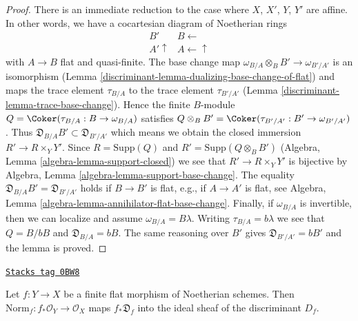 \begin{proof}

There is an immediate reduction to the case where $X$, $X'$, $Y$, $Y'$
are affine. In other words, we have a cocartesian diagram of Noetherian
rings
$$
\begin{array}{cc}B' & B \longleftarrow \\ A' \uparrow & A \longleftarrow\uparrow\end{array}
$$
with $A \to B$ flat and quasi-finite. The base change map
$\omega_{B/A} \otimes_B B' \to \omega_{B'/A'}$ is an isomorphism
(Lemma \ref{discriminant-lemma-dualizing-base-change-of-flat}) and maps
the trace element $\tau_{B/A}$ to the trace element $\tau_{B'/A'}$
(Lemma \ref{discriminant-lemma-trace-base-change}).
Hence the finite $B$-module $Q = \Coker(\tau_{B/A} : B \to \omega_{B/A})$
satisfies $Q \otimes_B B' = \Coker(\tau_{B'/A'} : B' \to \omega_{B'/A'})$.
Thus $\mathfrak{D}_{B/A}B' \subset \mathfrak{D}_{B'/A'}$ which means
we obtain the closed immersion $R' \to R \times_Y Y'$.
Since $R = \text{Supp}(Q)$ and $R' = \text{Supp}(Q \otimes_B B')$
(Algebra, Lemma \ref{algebra-lemma-support-closed})
we see that $R' \to R \times_Y Y'$ is bijective by
Algebra, Lemma \ref{algebra-lemma-support-base-change}.
The equality $\mathfrak{D}_{B/A}B' = \mathfrak{D}_{B'/A'}$ holds
if $B \to B'$ is flat, e.g., if $A \to A'$ is flat, see
Algebra, Lemma \ref{algebra-lemma-annihilator-flat-base-change}.
Finally, if $\omega_{B/A}$ is invertible, then we can localize
and assume $\omega_{B/A} = B \lambda$. Writing $\tau_{B/A} = b\lambda$
we see that $Q = B/bB$ and $\mathfrak{D}_{B/A} = bB$.
The same reasoning over $B'$
gives $\mathfrak{D}_{B'/A'} = bB'$ and the lemma is proved.
\end{proof}

\begin{lemma}
\label{discriminant-lemma-norm-different-in-discriminant}
\href{https://stacks.math.columbia.edu/tag/0BW8}{\texttt{Stacks tag 0BW8}}

Let $f : Y \to X$ be a finite flat morphism of Noetherian schemes.
Then $\text{Norm}_f : f_*\mathcal{O}_Y \to \mathcal{O}_X$ maps
$f_*\mathfrak{D}_f$ into the ideal sheaf of the discriminant $D_f$.
\end{lemma}

